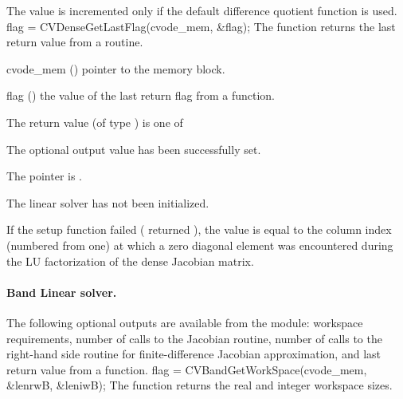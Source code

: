 {
  The value  is incremented only if the default 
   difference quotient function is used.
}
{
  flag = CVDenseGetLastFlag(cvode\_mem, \&flag);
}
{
  The function  returns the
  last return value from a {\cvdense} routine. 
}
{
  \begin{args}
  \item[cvode\_mem] ()
    pointer to the {\cvode} memory block.
  \item[flag] ()
    the value of the last return flag from a {\cvdense} function.
  \end{args}
}
{
  The return value  (of type ) is one of
  \begin{args}
  \item[\Id{CVDENSE\_SUCCESS}] 
    The optional output value has been successfully set.
  \item[\Id{CVDENSE\_MEM\_NULL}]
    The  pointer is .
  \item[\Id{CVDENSE\_LMEM\_NULL}]
    The {\cvdense} linear solver has not been initialized.
  \end{args}
}
{
  If the {\cvdense} setup function failed ( returned ),
  the value  is equal to the column index (numbered from one) at which
  a zero diagonal element was encountered during the LU factorization of the 
  dense Jacobian matrix.
}
%
%
\noindent\paragraph{\bf Band Linear solver.}
The following optional outputs are available from the {\cvband} module:
workspace requirements, number of calls to the Jacobian routine, number of 
calls to the right-hand side routine for finite-difference Jacobian approximation,
and last return value from a {\cvband} function.
{
  flag = CVBandGetWorkSpace(cvode\_mem, \&lenrwB, \&leniwB);
}
{
  The function  returns the
  {\cvband} real and integer workspace sizes.
}

